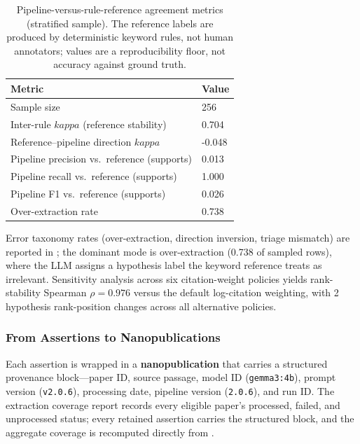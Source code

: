 \documentclass[
  english,
]{article}
\begin{document}
\begin{table}[htbp]
\centering
\caption{Pipeline-versus-rule-reference agreement metrics (stratified sample). The reference labels are produced by deterministic keyword rules, not human annotators; values are a reproducibility floor, not accuracy against ground truth.}
\label{tab:validation_metrics}
\begin{tabular}{ll}
\toprule
\textbf{Metric} & \textbf{Value} \\
\midrule
Sample size & 256 \\
Inter-rule $kappa$ (reference stability) & 0.704 \\
Reference--pipeline direction $kappa$ & -0.048 \\
Pipeline precision vs.\ reference (supports) & 0.013 \\
Pipeline recall vs.\ reference (supports) & 1.000 \\
Pipeline F1 vs.\ reference (supports) & 0.026 \\
Over-extraction rate & 0.738 \\
\bottomrule
\end{tabular}
\end{table}

Error taxonomy rates (over-extraction, direction inversion, triage
mismatch) are reported in
; the dominant mode is
over-extraction (0.738 of sampled rows), where the LLM assigns a
hypothesis label the keyword reference treats as irrelevant. Sensitivity
analysis across six citation-weight policies yields rank-stability
Spearman \(\rho = 0.976\) versus the default log-citation weighting,
with 2 hypothesis rank-position changes across all alternative policies.

\subsubsection{From Assertions to
Nanopublications}\label{from-assertions-to-nanopublications}

Each assertion is wrapped in a \textbf{nanopublication}
\citep{groth2010anatomy, kuhn2016decentralized} that carries a
structured provenance block---paper ID, source passage, model ID
(\texttt{gemma3:4b}), prompt version (\texttt{v2.0.6}), processing date,
pipeline version (\texttt{2.0.6}), and run ID. The extraction coverage
report records every eligible paper's processed, failed, and unprocessed
status; every retained assertion carries the structured block, and the
aggregate coverage is recomputed directly from
.
\end{document}
